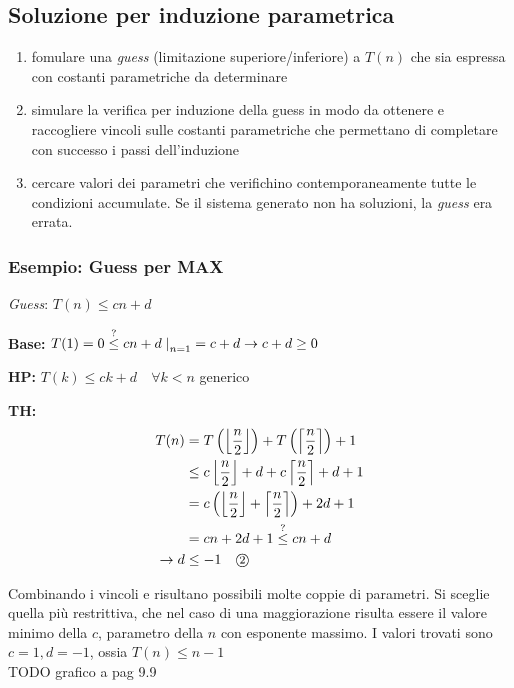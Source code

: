\subsection{Soluzione per induzione parametrica}
\begin{enumerate}
    \item fomulare una \textit{guess} (limitazione superiore/inferiore) a $T(n)$ che sia espressa con costanti parametriche da determinare
    \item simulare la verifica per induzione della guess in modo da ottenere e raccogliere vincoli sulle costanti parametriche che permettano di completare con successo i passi dell'induzione
    \item cercare valori dei parametri che verifichino contemporaneamente tutte le condizioni accumulate. Se il sistema generato non ha soluzioni, la \textit{guess} era errata.
\end{enumerate}

\subsubsection{Esempio: Guess per MAX}
\textit{Guess}: $T(n) \leq cn+d$
\begin{description}
    \item{\textbf{Base:}} $T(1) = 0 \overset{?}{\leq} cn+d \left. \right|_{n=1} = c+d \rightarrow
            c+d\geq 0 $ 
    \item{\textbf{HP:}} $T(k) \leq ck+d \quad \forall k<n $ generico
    \item{\textbf{TH:}} 
        \begin{equation*}
            \begin{split}
                T(n) &=
                T \left( \left\lfloor \frac{n}{2} \right\rfloor \right) 
                + T \left( \left\lceil \frac{n}{2} \right\rceil \right) + 1 \\
                &\leq c \left\lfloor \frac{n}{2} \right\rfloor +d + c \left\lceil \frac{n}{2} \right\rceil +d + 1 \\
                &= c \left( \left\lfloor \frac{n}{2} \right\rfloor + \left\lceil \frac{n}{2} \right\rceil \right) +2d + 1 \\
                &= cn + 2d + 1 \overset{?}{\leq} cn+d \\
                \rightarrow d &\leq -1 \quad \mbox{\textcircled{\footnotesize 2}}
            \end{split}
        \end{equation*}
\end{description}
Combinando i vincoli  e  risultano possibili molte coppie di parametri. Si sceglie quella più restrittiva, che nel caso di una maggiorazione risulta essere il valore minimo della $c$, parametro della $n$ con esponente massimo.
I valori trovati sono $c=1, d=-1$, ossia $T(n) \leq n-1$\\
TODO grafico a pag 9.9


